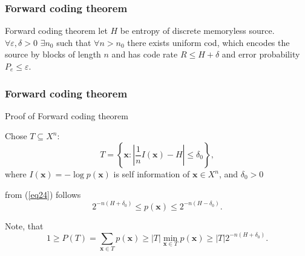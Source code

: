 \documentclass[14pt]{beamer}
\renewcommand{\vec}[1]{\ensuremath{\boldsymbol{#1}}}
\begin{document}


\begin{frame}
\frametitle{Forward coding theorem}


    \begin{theorem} {Forward coding theorem}
    let $H$ be entropy of discrete memoryless source. $\forall \varepsilon ,\delta > 0$ $\exists n_0 $ such that
    $\forall n > n_0 $ there exists uniform cod, which encodes the source by blocks of length $n$ and has code rate $R \le H + \delta $ and error probability $P_e \le \varepsilon $.
    \end{theorem}

\end{frame}


\begin{frame}
\frametitle{Forward coding theorem}
Proof of Forward coding theorem
\begin{itemize}
\small{  

    \item Chose  $T \subseteq X^n$:
    \begin{equation}
    \label{eq24} T = \left\{ {\vec x:\left| {\frac{1}{n}I(\vec x) - H}
    \right| \le \delta _0 } \right\},
    \end{equation}
    where $I(\vec x) = - \log p(\vec x)$ is self information of $\vec x \in X^n$, and $\delta _0 > 0 $
    
    \item from (\ref{eq24}) follows
    \begin{equation}
    \label{eq25} 2^{ - n(H + \delta _0 )} \le p(\vec x) \le 2^{ - n(H
    - \delta _0 )}.
    \end{equation}

    \item Note, that
    \[
    1 \ge P(T) = \sum\limits_{\vec x \in T} {p(\vec x)} \ge \vert
    T\vert \mathop {\min }\limits_{\vec x \in T} p(\vec x) \ge \vert
    T\vert 2^{ - n(H + \delta _0 )}.
    \]
}
\end{itemize}
\end{frame}
\end{document}
